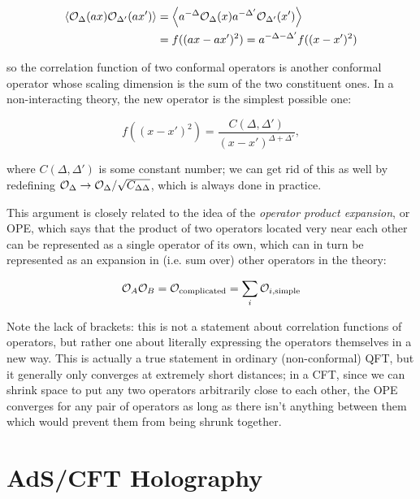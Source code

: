\begin{align}
    \left \langle {\cal O}_\Delta(ax) {\cal O}_{\Delta'}(ax') \right \rangle
    &= \left \langle a^{-\Delta} {\cal O}_\Delta(x) 
                    a^{-\Delta'} {\cal O}_{\Delta'}(x') \right \rangle \\
    &= f((ax - ax')^2) = a^{-\Delta - \Delta'} f((x - x')^2)
\end{align}

so the correlation function of two conformal operators is another conformal
operator whose scaling dimension is the sum of the two constituent ones. In a 
non-interacting theory, the new operator is the simplest possible one:

\begin{equation}
    f((x - x')^2) = \frac{C(\Delta, \Delta')}{(x - x')^{\Delta + \Delta'}},
\end{equation}

where $C(\Delta, \Delta')$ is some constant number; we can get rid of this as
well by redefining 
${\cal O}_\Delta \to {\cal O}_\Delta / \sqrt{C_{\Delta \Delta}}$, which is 
always done in practice.

This argument is closely related to the idea of the \emph{operator product
expansion}, or OPE, which says that the product of two operators located very
near each other can be represented as a single operator of its own, which can in
turn be represented as an expansion in (i.e. sum over) other operators in the
theory:

\begin{equation}
    {\cal O}_A {\cal O}_B = {\cal O}_\mathrm{complicated} 
    = \sum_i {\cal O}_{i,\mathrm{simple}}
\end{equation}

Note the lack of brackets: this is not a statement about correlation functions
of operators, but rather one about literally expressing the operators themselves
in a new way. This is actually a true statement in ordinary (non-conformal) 
QFT\cite{Weinberg:1995mt}, but it generally only converges at extremely short 
distances; in a CFT, since we can shrink space to put any two operators 
arbitrarily close to each other, the OPE converges for any pair of operators as 
long as there isn't anything between them which would prevent them from being 
shrunk together\cite{Kaplan:cftnotes}.

\section{AdS/CFT Holography}
\label{sec:adscft}

